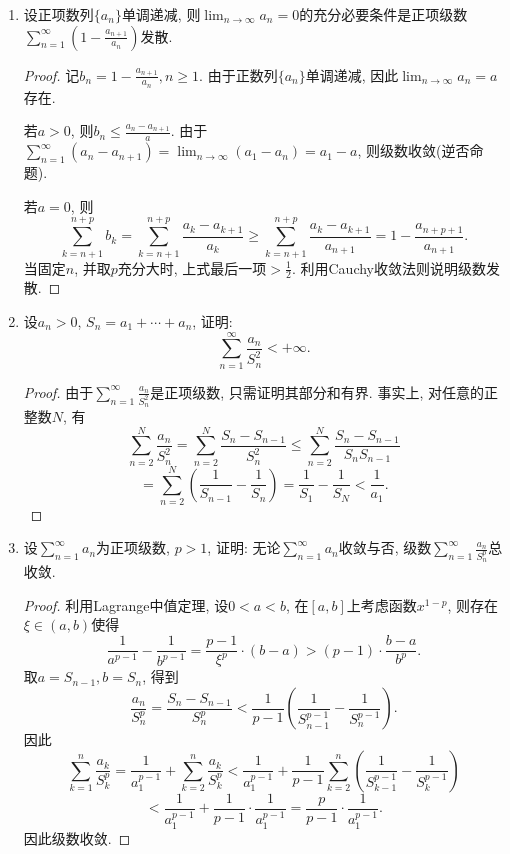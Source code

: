 \documentclass[UTF8,11pt, a4paper, oneside, fontset=none]{ctexbook}
\begin{document}
\begin{enumerate}


\item 设正项数列$\{ a_n \}$单调递减, 则$\lim_{n \to \infty} a_n = 0$的充分必要条件是正项级数$\sum_{n=1}^{\infty} \left( 1 - \frac{a_{n+1}}{a_n} \right)$发散.


\begin{proof}

记$b_n = 1 -  \frac{a_{n+1}}{a_n}, n \geq 1$. 由于正数列$\{ a_n \}$单调递减, 因此$\lim_{n \to \infty} a_n = a$存在. 


若$a >0$, 则$b_n \leq \frac{a_n - a_{n+1}}{a}$. 由于$\sum_{n=1}^{\infty} (a_n - a_{n+1}) = \lim_{n \to \infty} (a_1 - a_n) = a_1 - a$, 则级数收敛(逆否命题).


若$a = 0$, 则
\[
\sum_{k = n+1}^{n+p} b_k = \sum_{k = n+1}^{n+p} \frac{a_k - a_{k+1}}{a_k} \geq \sum_{k = n+1}^{n+p}  \frac{a_k - a_{k+1}}{a_{n+1}} = 1 - \frac{a_{n+p+1}}{a_{n+1}}.
\]
当固定$n$, 并取$p$充分大时, 上式最后一项$> \frac{1}{2}$. 利用Cauchy收敛法则说明级数发散.

\end{proof}


\item 设$a_n >0$, $ S_n = a_1 + \cdots + a_n$, 证明:
\[
\sum_{n=1}^{\infty} \frac{a_n}{S_n^2} < +\infty.
\]

\begin{proof}


由于$\sum_{n=1}^{\infty}  \frac{a_n}{S_n^2}$是正项级数, 只需证明其部分和有界. 事实上, 对任意的正整数$N$,  有
\[
\sum_{n=2}^{N} \frac{a_n}{S_n^2} = \sum_{n=2}^{N} \frac{S_n - S_{n-1}}{S_n^2} \leq \sum_{n=2}^{N} \frac{S_n - S_{n-1}}{S_nS_{n-1}}
\]
\[
= \sum_{n=2}^{N} \left( \frac{1}{S_{n-1}} - \frac{1}{S_n} \right) = \frac{1}{S_1} - \frac{1}{S_N} < \frac{1}{a_1}.
\]
\end{proof}


\item 设$\sum_{n=1}^{\infty} a_n$为正项级数, $p>1$, 证明: 无论$\sum_{n=1}^{\infty} a_n$收敛与否, 级数$\sum_{n=1}^{\infty} \frac{a_n}{S_n^p}$总收敛.

\begin{proof}

利用Lagrange中值定理, 设$0 < a < b$, 在$[a, b]$上考虑函数$x^{1-p}$, 则存在$\xi \in (a, b)$使得
\[
\frac{1}{a^{p-1}} - \frac{1}{b^{p-1}} = \frac{p-1}{\xi^p} \cdot (b-a) > ( p - 1) \cdot \frac{b-a}{b^p}.
\]
取$a = S_{n-1}, b = S_n$, 得到
\[
\frac{a_n}{S_n^p} = \frac{S_n - S_{n-1}}{S_n^p} < \frac{1}{p-1} \left( \frac{1}{S_{n-1}^{p-1}} - \frac{1}{S_n^{p-1}} \right).
\]
因此
\[
\sum_{k=1}^{n} \frac{a_k}{S_k^p} = \frac{1}{a_1^{p-1}} + \sum_{k=2}^{n} \frac{a_k}{S_k^p} < \frac{1}{a_1^{p-1}} + \frac{1}{p-1} \sum_{k=2}^{n} \left( \frac{1}{S_{k-1}^{p-1}} - \frac{1}{S_k^{p-1}} \right)
\]
\[
< \frac{1}{a_1^{p-1}} + \frac{1}{p-1} \cdot \frac{1}{a_1^{p-1}} = \frac{p}{p-1} \cdot \frac{1}{a_1^{p-1}}.
\]
因此级数收敛.


\end{proof}
\end{enumerate}
\end{document}
